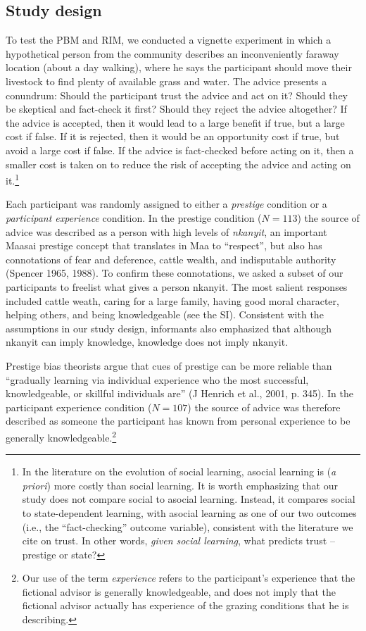 \documentclass[
  11pt,
]{article}
\begin{document}
\hypertarget{study-design}{%
\subsection{Study design}\label{study-design}}

To test the PBM and RIM, we conducted a vignette experiment in which a
hypothetical person from the community describes an inconveniently
faraway location (about a day walking), where he says the participant
should move their livestock to find plenty of available grass and water.
The advice presents a conundrum: Should the participant trust the advice
and act on it? Should they be skeptical and fact-check it first? Should
they reject the advice altogether? If the advice is accepted, then it
would lead to a large benefit if true, but a large cost if false. If it
is rejected, then it would be an opportunity cost if true, but avoid a
large cost if false. If the advice is fact-checked before acting on it,
then a smaller cost is taken on to reduce the risk of accepting the
advice and acting on
it.\footnote{In the literature on the evolution of social learning, asocial learning is (\emph{a priori}) more costly than social learning. It is worth emphasizing that our study does not compare social to asocial learning. Instead, it compares social to state-dependent learning, with asocial learning as one of our two outcomes (i.e., the “fact-checking” outcome variable), consistent with the literature we cite on trust. In other words, \emph{given social learning}, what predicts trust -- prestige or state?}

Each participant was randomly assigned to either a \emph{prestige}
condition or a \emph{participant experience} condition. In the prestige
condition (\(N=113\)) the source of advice was described as a person
with high levels of \emph{nkanyit}, an important Maasai prestige concept
that translates in Maa to ``respect'', but also has connotations of fear
and deference, cattle wealth, and indisputable authority (Spencer 1965,
1988). To confirm these connotations, we asked a subset of our
participants to freelist what gives a person nkanyit. The most salient
responses included cattle weath, caring for a large family, having good
moral character, helping others, and being knowledgeable (see the SI).
Consistent with the assumptions in our study design, informants also
emphasized that although nkanyit can imply knowledge, knowledge does not
imply nkanyit.

Prestige bias theorists argue that cues of prestige can be more reliable
than ``gradually learning via individual experience who the most
successful, knowledgeable, or skillful individuals are'' (J Henrich et
al., 2001, p. 345). In the participant experience condition (\(N=107\))
the source of advice was therefore described as someone the participant
has known from personal experience to be generally
knowledgeable.\footnote{Our use of the term \emph{experience} refers to the participant's experience that the fictional advisor is generally knowledgeable, and does not imply that the fictional advisor actually has experience of the grazing conditions that he is describing.}
\end{document}
